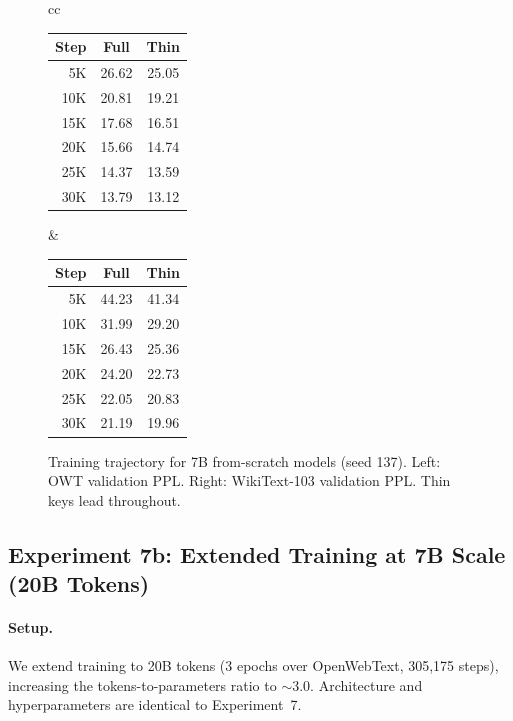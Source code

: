 \documentclass[11pt]{article}
\begin{document}
\begin{figure}[h]
\centering
\begin{tabular}{cc}
\small
\begin{tabular}{rcc}
\toprule
Step & Full & Thin \\
\midrule
5K  & 26.62 & 25.05 \\
10K & 20.81 & 19.21 \\
15K & 17.68 & 16.51 \\
20K & 15.66 & 14.74 \\
25K & 14.37 & 13.59 \\
30K & 13.79 & 13.12 \\
\bottomrule
\end{tabular}
&
\small
\begin{tabular}{rcc}
\toprule
Step & Full & Thin \\
\midrule
5K  & 44.23 & 41.34 \\
10K & 31.99 & 29.20 \\
15K & 26.43 & 25.36 \\
20K & 24.20 & 22.73 \\
25K & 22.05 & 20.83 \\
30K & 21.19 & 19.96 \\
\bottomrule
\end{tabular}
\end{tabular}
\caption{Training trajectory for 7B from-scratch models (seed 137). Left: OWT validation PPL. Right: WikiText-103 validation PPL. Thin keys lead throughout.}
\label{fig:7b_trajectory}
\end{figure}


\subsection{Experiment 7b: Extended Training at 7B Scale (20B Tokens)}\label{sec:exp7b}

\paragraph{Setup.}
We extend training to 20B tokens (3 epochs over OpenWebText, 305{,}175 steps), increasing the tokens-to-parameters ratio to $\sim$3.0. Architecture and hyperparameters are identical to Experiment~7.
\end{document}
